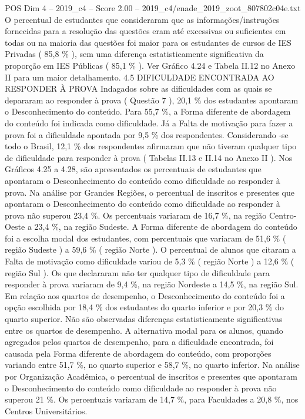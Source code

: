 \begin{textsample}{POS Dim 4 – 2019\_c4 – Score 2.00 – 2019\_c4/enade\_2019\_zoot\_807802c04e.txt}
O percentual de estudantes que consideraram que as informações/instruções fornecidas para a resolução das questões eram até excessivas ou suficientes em todas ou na maioria das questões foi maior para os estudantes de cursos de IES Privadas ( 85,8 \% ), sem uma diferença estatisticamente significativa da proporção em IES Públicas ( 85,1 \% ).
Ver Gráfico 4.24 e Tabela II.12 no Anexo II para um maior detalhamento. 4.5 DIFICULDADE ENCONTRADA AO RESPONDER À PROVA Indagados sobre as dificuldades com as quais se depararam ao responder à prova ( Questão 7 ), 20,1 \% dos estudantes apontaram o Desconhecimento do conteúdo.
Para 55,7 \%, a Forma diferente de abordagem do conteúdo foi indicada como dificuldade.
Já a Falta de motivação para fazer a prova foi a dificuldade apontada por 9,5 \% dos respondentes.
Considerando -se todo o Brasil, 12,1 \% dos respondentes afirmaram que não tiveram qualquer tipo de dificuldade para responder à prova ( Tabelas II.13 e II.14 no Anexo II ).
Nos Gráficos 4.25 a 4.28, são apresentados os percentuais de estudantes que apontaram o Desconhecimento do conteúdo como dificuldade ao responder à prova.
Na análise por Grandes Regiões, o percentual de inscritos e presentes que apontaram o Desconhecimento do conteúdo como dificuldade ao responder à prova não superou 23,4 \%.
Os percentuais variaram de 16,7 \%, na região Centro-Oeste a 23,4 \%, na região Sudeste.
A Forma diferente de abordagem do conteúdo foi a escolha modal dos estudantes, com percentuais que variaram de 51,6 \% ( região Sudeste ) a 59,6 \% ( região Norte ).
O percentual de alunos que citaram a Falta de motivação como dificuldade variou de 5,3 \% ( região Norte ) a 12,6 \% ( região Sul ).
Os que declararam não ter qualquer tipo de dificuldade para responder à prova variaram de 9,4 \%, na região Nordeste a 14,5 \%, na região Sul.
Em relação aos quartos de desempenho, o Desconhecimento do conteúdo foi a opção escolhida por 18,4 \% dos estudantes do quarto inferior e por 20,3 \% do quarto superior.
Não são observadas diferenças estatisticamente significativas entre os quartos de desempenho.
A alternativa modal para os alunos, quando agregados pelos quartos de desempenho, para a dificuldade encontrada, foi causada pela Forma diferente de abordagem do conteúdo, com proporções variando entre 51,7 \%, no quarto superior e 58,7 \%, no quarto inferior.
Na análise por Organização Acadêmica, o percentual de inscritos e presentes que apontaram o Desconhecimento do conteúdo como dificuldade ao responder à prova não superou 21 \%.
Os percentuais variaram de 14,7 \%, para Faculdades a 20,8 \%, nos Centros Universitários.

\end{textsample}
